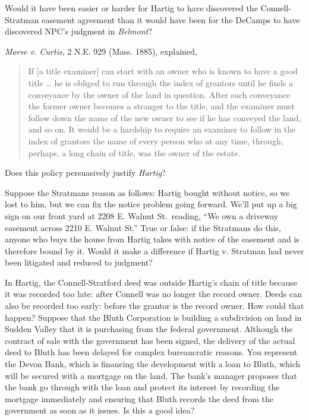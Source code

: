 
\item Would it have been easier or harder for Hartig to have discovered the
Connell-Stratman easement agreement than it would have been for the DeCamps to
have discovered NPC's judgment in \textit{Belmont}? 

\item \textit{Morse v. Curtis}, 2 N.E. 929 (Mass. 1885), explained,
\begin{quote}
If [a title examiner] can start with an owner who is known to have a good title
\dots{} he is obliged to run through the index of grantors until he finds a
conveyance by the owner of the land in question. After such conveyance the
former owner becomes a stranger to the title, and the examiner must follow down
the name of the new owner to see if he has conveyed the land, and so on. It
would be a hardship to require an examiner to follow in the index of grantors
the name of every person who at any time, through, perhaps, a long chain of
title, was the owner of the estate.
\end{quote}
Does this policy persuasively justify \textit{Hartig}?



\item Suppose the Stratmans reason as follows: Hartig bought without notice, so
we lost to him, but we can fix the notice problem going forward. We'll put up a
big sign on our front yard at 2208 E. Walnut St.\ reading, ``We own a driveway
easement across 2210 E. Walnut St.'' True or false: if the Stratmans do this,
anyone who buys the house from Hartig takes with notice of the easement and is
therefore bound by it. Would it make a difference if Hartig v. Stratman had
never been litigated and reduced to judgment?


\item In Hartig, the Connell-Stratford deed was outside Hartig's chain of title
because it was recorded too late: after Connell was no longer the record owner.
Deeds can also be recorded too early: before the grantor is the record owner.
How could that happen? Suppose that the Bluth Corporation is building a
subdivision on land in Sudden Valley that it is purchasing from the federal
government. Although the contract of sale with the government has been signed,
the delivery of the actual deed to Bluth has been delayed for complex
bureaucratic reasons. You represent the Devon Bank, which is financing the
development with a loan to Bluth, which will be secured with a mortgage on the
land. The bank's manager proposes that the bank go through with the loan and
protect its interest by recording the mortgage immediately and ensuring that
Bluth records the deed from the government as soon as it issues. Is this a good
idea?


